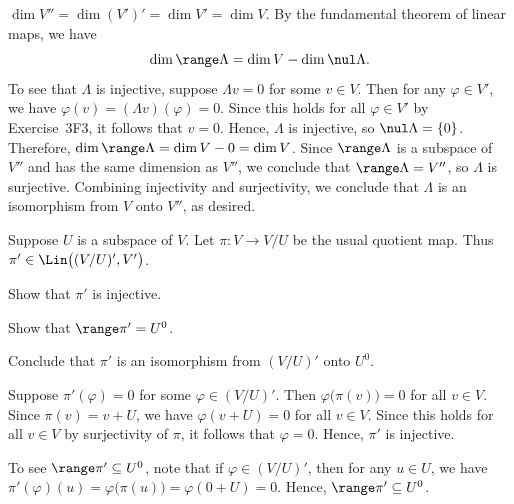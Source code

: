 \begin{exc}
\begin{solution}
\begin{parts}
  $\dim V''=\dim(V')'=\dim V'=\dim V$. By the fundamental theorem of linear
  maps, we have
  \[ \dim\range\Lambda = \dim V-\dim\nul\Lambda. \]
  To see that $\Lambda$ is injective, suppose $\Lambda v=0$ for some $v\in V$.
  Then for any $\varphi\in V'$, we have $\varphi(v)=(\Lambda v)(\varphi)=0$.
  Since this holds for all $\varphi\in V'$ by Exercise~3F3, it follows that
  $v=0$. Hence, $\Lambda$ is injective, so $\nul\Lambda=\{0\}$. Therefore,
  $\dim\range\Lambda=\dim V-0=\dim V$. Since $\range\Lambda$ is a subspace of
  $V''$ and has the same dimension as $V''$, we conclude that
  $\range\Lambda=V''$, so $\Lambda$ is surjective. Combining injectivity and
  surjectivity, we conclude that $\Lambda$ is an isomorphism from $V$ onto
  $V''$, as desired.
\end{parts}
\end{solution}

\begin{exercise}
Suppose $U$ is a subspace of $V$. Let $\pi\colon V\to V/U$ be the usual quotient
map. Thus $\pi'\in\Lin\bigl((V/U)',V'\bigr)$.
\begin{parts}
\item Show that $\pi'$ is injective.
\item Show that $\range\pi'=U^0$.
\item Conclude that $\pi'$ is an isomorphism from $(V/U)'$ onto $U^0$.
\end{parts}
\end{exercise}
\begin{solution}\leavevmode
\begin{parts}
\item Suppose $\pi'(\varphi)=0$ for some $\varphi\in(V/U)'$. Then
  $\varphi\bigl(\pi(v)\bigr)=0$ for all $v\in V$. Since $\pi(v)=v+U$, we have
  $\varphi(v+U)=0$ for all $v\in V$. Since this holds for all $v\in V$ by
  surjectivity of $\pi$, it follows that $\varphi=0$. Hence, $\pi'$ is
  injective.
\item To see $\range\pi'\subseteq U^0$, note that if $\varphi\in(V/U)'$, then
  for any $u\in U$, we have
  $\pi'(\varphi)(u)=\varphi\bigl(\pi(u)\bigr)=\varphi(0+U)=0$. Hence,
  $\range\pi'\subseteq U^0$.


\end{parts}
\end{solution}
\end{exc}
